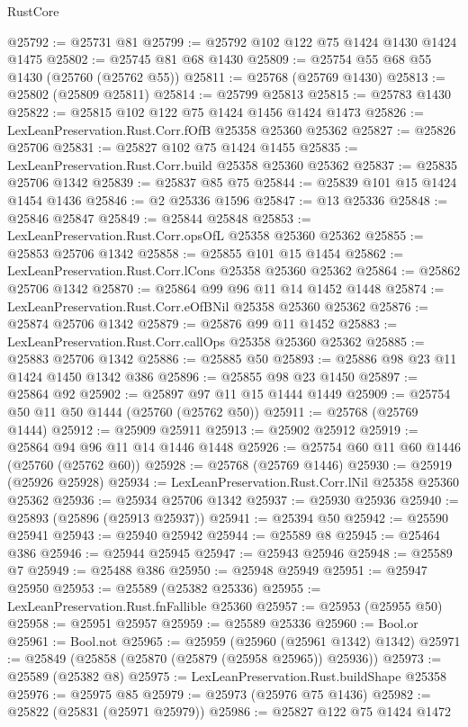 \begin{lexlean}{RustCore}
\begin{coremodule}
@25792 := @25731 @81
@25799 := @25792 @102 @122 @75 @1424 @1430 @1424 @1475
@25802 := @25745 @81 @68 @1430
@25809 := @25754 @55 @68 @55 @1430 (@25760 (@25762 @55))
@25811 := @25768 (@25769 @1430)
@25813 := @25802 (@25809 @25811)
@25814 := @25799 @25813
@25815 := @25783 @1430
@25822 := @25815 @102 @122 @75 @1424 @1456 @1424 @1473
@25826 := LexLeanPreservation.Rust.Corr.fOfB @25358 @25360 @25362
@25827 := @25826 @25706
@25831 := @25827 @102 @75 @1424 @1455
@25835 := LexLeanPreservation.Rust.Corr.build @25358 @25360 @25362
@25837 := @25835 @25706 @1342
@25839 := @25837 @85 @75
@25844 := @25839 @101 @15 @1424 @1454 @1436
@25846 := @2 @25336 @1596
@25847 := @13 @25336
@25848 := @25846 @25847
@25849 := @25844 @25848
@25853 := LexLeanPreservation.Rust.Corr.opsOfL @25358 @25360 @25362
@25855 := @25853 @25706 @1342
@25858 := @25855 @101 @15 @1454
@25862 := LexLeanPreservation.Rust.Corr.lCons @25358 @25360 @25362
@25864 := @25862 @25706 @1342
@25870 := @25864 @99 @96 @11 @14 @1452 @1448
@25874 := LexLeanPreservation.Rust.Corr.eOfBNil @25358 @25360 @25362
@25876 := @25874 @25706 @1342
@25879 := @25876 @99 @11 @1452
@25883 := LexLeanPreservation.Rust.Corr.callOps @25358 @25360 @25362
@25885 := @25883 @25706 @1342
@25886 := @25885 @50
@25893 := @25886 @98 @23 @11 @1424 @1450 @1342 @386
@25896 := @25855 @98 @23 @1450
@25897 := @25864 @92
@25902 := @25897 @97 @11 @15 @1444 @1449
@25909 := @25754 @50 @11 @50 @1444 (@25760 (@25762 @50))
@25911 := @25768 (@25769 @1444)
@25912 := @25909 @25911
@25913 := @25902 @25912
@25919 := @25864 @94 @96 @11 @14 @1446 @1448
@25926 := @25754 @60 @11 @60 @1446 (@25760 (@25762 @60))
@25928 := @25768 (@25769 @1446)
@25930 := @25919 (@25926 @25928)
@25934 := LexLeanPreservation.Rust.Corr.lNil @25358 @25360 @25362
@25936 := @25934 @25706 @1342
@25937 := @25930 @25936
@25940 := @25893 (@25896 (@25913 @25937))
@25941 := @25394 @50
@25942 := @25590 @25941
@25943 := @25940 @25942
@25944 := @25589 @8
@25945 := @25464 @386
@25946 := @25944 @25945
@25947 := @25943 @25946
@25948 := @25589 @7
@25949 := @25488 @386
@25950 := @25948 @25949
@25951 := @25947 @25950
@25953 := @25589 (@25382 @25336)
@25955 := LexLeanPreservation.Rust.fnFallible @25360
@25957 := @25953 (@25955 @50)
@25958 := @25951 @25957
@25959 := @25589 @25336
@25960 := Bool.or
@25961 := Bool.not
@25965 := @25959 (@25960 (@25961 @1342) @1342)
@25971 := @25849 (@25858 (@25870 (@25879 (@25958 @25965)) @25936))
@25973 := @25589 (@25382 @8)
@25975 := LexLeanPreservation.Rust.buildShape @25358
@25976 := @25975 @85
@25979 := @25973 (@25976 @75 @1436)
@25982 := @25822 (@25831 (@25971 @25979))
@25986 := @25827 @122 @75 @1424 @1472

\end{coremodule}
\end{lexlean}
